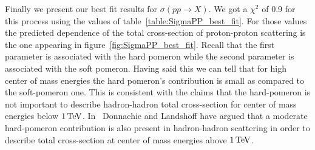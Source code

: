 \documentclass[preprint, 12pt]{elsarticle}
\begin{document}


Finally we present our best fit results for $\sigma\left(p p \rightarrow X\right)$. We got a $\chi^2$ of 0.9 for this process using the values of table~\ref{table:SigmaPP_best_fit}. For those values the predicted dependence of the total cross-section of proton-proton scattering is the one appearing in figure~\ref{fig:SigmaPP_best_fit}. Recall that the first parameter is associated with the hard pomeron while the second parameter is associated with the soft pomeron. Having said this we can tell that for high center of mass energies the hard pomeron's contribution is small as compared to the soft-pomeron one. This is consistent with the claims that the hard-pomeron is not important to describe hadron-hadron total cross-section for center of mass energies below $1 {\rm \, TeV}$. In~\cite{Donnachie:2011aa} Donnachie and Landshoff have argued that a moderate hard-pomeron contribution is also present in hadron-hadron scattering in order to describe total cross-section at center of mass energies above $1 {\rm \, TeV}$.
\end{document}
